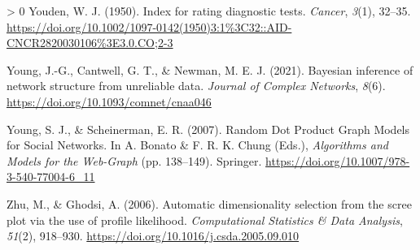 \documentclass[10pt,oneside]{article}
\newlength{\cslhangindent}
\newenvironment{CSLReferences}[3] %
 {%
  \setlength{\parindent}{0pt}
  \ifodd #1 \everypar{\setlength{\hangindent}{\cslhangindent}}\ignorespaces\fi
  \ifnum #2 > 0
  \setlength{\parskip}{#2\baselineskip}
  \fi
 }%
 {}
\begin{document}
\begin{CSLReferences}{1}{0}
\leavevmode\hypertarget{ref-Youden1950IndRat}{}%
Youden, W. J. (1950). Index for rating diagnostic tests. \emph{Cancer},
\emph{3}(1), 32--35.
\url{https://doi.org/10.1002/1097-0142(1950)3:1\%3C32::AID-CNCR2820030106\%3E3.0.CO;2-3}

\leavevmode\hypertarget{ref-Young2021BayInf}{}%
Young, J.-G., Cantwell, G. T., \& Newman, M. E. J. (2021). Bayesian
inference of network structure from unreliable data. \emph{Journal of
Complex Networks}, \emph{8}(6).
\url{https://doi.org/10.1093/comnet/cnaa046}

\leavevmode\hypertarget{ref-Young2007RanDot}{}%
Young, S. J., \& Scheinerman, E. R. (2007). Random Dot Product Graph
Models for Social Networks. In A. Bonato \& F. R. K. Chung (Eds.),
\emph{Algorithms and Models for the Web-Graph} (pp. 138--149). Springer.
\url{https://doi.org/10.1007/978-3-540-77004-6_11}

\leavevmode\hypertarget{ref-Zhu2006AutDim}{}%
Zhu, M., \& Ghodsi, A. (2006). Automatic dimensionality selection from
the scree plot via the use of profile likelihood. \emph{Computational
Statistics \& Data Analysis}, \emph{51}(2), 918--930.
\url{https://doi.org/10.1016/j.csda.2005.09.010}

\end{CSLReferences}
\end{document}
